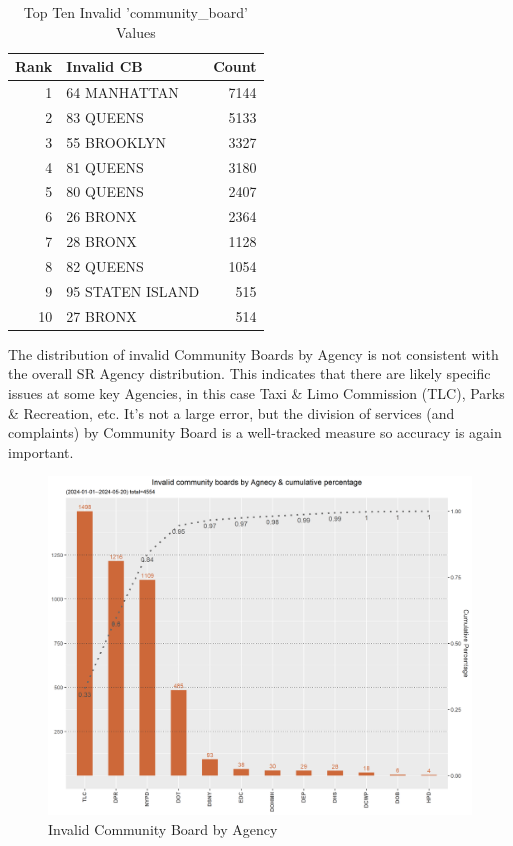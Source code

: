 \documentclass[12pt, titlepage]{article}
\begin{document}
{		\begin{table}[H]
		\centering
		\footnotesize
		\begin{tabular}{rlr}
		\toprule
		\textbf{Rank} & \textbf{Invalid CB} & \textbf{Count} \\
			\midrule
				1 & 64 MANHATTAN & 7144 \\
				2 & 83 QUEENS & 5133 \\
				3 & 55 BROOKLYN & 3327 \\
				4 & 81 QUEENS & 3180 \\
				5 & 80 QUEENS & 2407 \\
				6 & 26 BRONX & 2364 \\
				7 & 28 BRONX & 1128 \\
				8 & 82 QUEENS & 1054 \\
				9 & 95 STATEN ISLAND & 515 \\
				10 & 27 BRONX & 514 \\
			\bottomrule
		\end{tabular}
		\caption{Top Ten Invalid 'community\_board' Values}
		\end{table}
		
		The distribution of invalid Community Boards by Agency is not consistent with the overall SR Agency distribution. This indicates that there are likely
		specific issues at some key Agencies, in this case Taxi \& Limo Commission (TLC), Parks \& Recreation, etc. It's not a large error, but the division of services
		(and complaints) by Community Board is a well-tracked measure so accuracy is again important.

		\begin{figure}[H]
	 	 \centering
		  \includegraphics[width = \textwidth]{invalid_community_boards.png}
		  \caption{Invalid Community Board by Agency}
		  \label{fig:invalid_community_boards}
		\end{figure}


}
\end{document}
